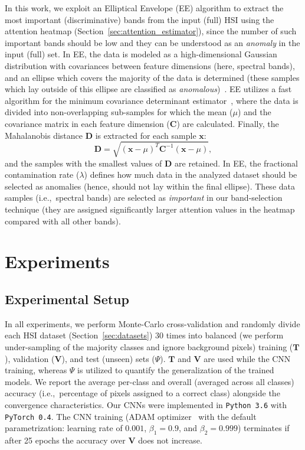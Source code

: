\documentclass[journal]{IEEEtran}
\newcommand{\TrainingSet}{\bm{T}} %
\newcommand{\ValidationSet}{\bm{V}} %
\newcommand{\TestSet}{\Psi}
\newcommand{\MeanSubsample}{{\mu}}
\newcommand{\CovarianceMatrix}{\bm{C}}
\newcommand{\MahalanobisDistance}{\bm{D}}
\newcommand{\Sample}{\bm{x}}
\newcommand{\ContaminationRate}{\lambda}
\begin{document}
In this work, we exploit an Elliptical Envelope (EE) algorithm to extract the most important (discriminative) bands from the input (full) HSI using the attention heatmap (Section~\ref{sec:attention_estimator}), since the number of such important bands should be low and they can be understood as an \emph{anomaly} in the input (full) set. In EE, the data is modeled as a high-dimensional Gaussian distribution with covariances between feature dimensions (here, spectral bands), and an ellipse which covers the majority of the data is determined (these samples which lay outside of this ellipse are classified as \emph{anomalous})~\cite{Hoyle2015anomaly}. EE utilizes a fast algorithm for the minimum covariance determinant estimator~\cite{doi:10.1080/00401706.1999.10485670}, where the data is divided into non-overlapping sub-samples for which the mean ($\MeanSubsample$) and the covariance matrix in each feature dimension ($\CovarianceMatrix$) are calculated. Finally, the Mahalanobis distance $\MahalanobisDistance$ is extracted for each sample $\Sample$:
\begin{equation}
\MahalanobisDistance=\sqrt{(\Sample-\MeanSubsample)^T\CovarianceMatrix^{-1}(\Sample-\MeanSubsample)},
\end{equation}
\noindent and the samples with the smallest values of $\MahalanobisDistance$ are retained. In EE, the fractional contamination rate ($\ContaminationRate$) defines how much data in the analyzed dataset should be selected as anomalies (hence, should not lay within the final ellipse). These data samples (i.e.,~spectral bands) are selected as \emph{important} in our band-selection technique (they are assigned significantly larger attention values in the heatmap compared with all other bands).


\section{Experiments}\label{sec:experiments}


\subsection{Experimental Setup}

In all experiments, we perform Monte-Carlo cross-validation and randomly divide each HSI dataset (Section~\ref{sec:datasets}) 30 times into balanced (we perform under-sampling of the majority classes and ignore background pixels) training ($\TrainingSet$), validation ($\ValidationSet$), and test (unseen) sets ($\TestSet$). $\TrainingSet$ and $\ValidationSet$ are used while the CNN training, whereas $\TestSet$ is utilized to quantify the generalization of the trained models. We report the average per-class and overall (averaged across all classes) accuracy (i.e.,~percentage of pixels assigned to a correct class) alongside the convergence characteristics. Our CNNs were implemented in \texttt{Python 3.6} with \texttt{PyTorch 0.4}. The CNN training (ADAM optimizer~\cite{DBLP:journals/corr/KingmaB14} with the default parametrization: learning rate of $0.001$, $\beta_1 = 0.9$, and $\beta_2 = 0.999$) terminates if after 25 epochs the accuracy over $\ValidationSet$ does not increase.
\end{document}
